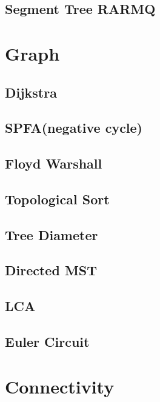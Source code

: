     \subsection{Segment Tree RARMQ}
        

\section{Graph}
    \subsection{Dijkstra}
        
    \subsection{SPFA(negative cycle)}
        
    \subsection{Floyd Warshall}
        
    \subsection{Topological Sort}
        
    \subsection{Tree Diameter}
        
    \subsection{Directed MST}
        
    \subsection{LCA}
        
    \subsection{Euler Circuit}
        

\section{Connectivity}
